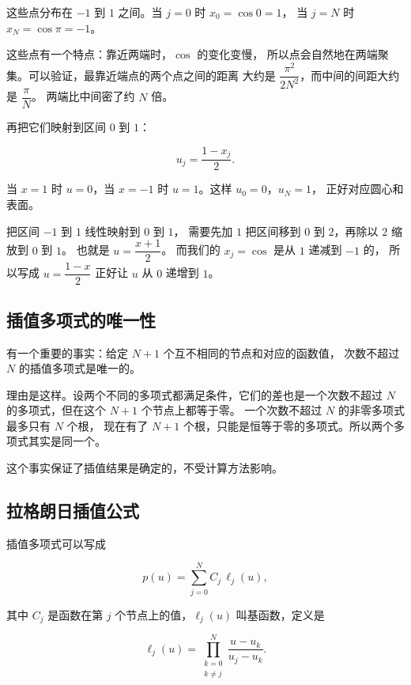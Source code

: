 这些点分布在 $-1$ 到 $1$ 之间。当 $j=0$ 时 $x_0=\cos0=1$，
当 $j=N$ 时 $x_N=\cos\pi=-1$。

这些点有一个特点：靠近两端时，$\cos$ 的变化变慢，
所以点会自然地在两端聚集。可以验证，最靠近端点的两个点之间的距离
大约是 $\dfrac{\pi^2}{2N^2}$，而中间的间距大约是 $\dfrac{\pi}{N}$。
两端比中间密了约 $N$ 倍。

再把它们映射到区间 $0$ 到 $1$：

\begin{equation}
u_j = \frac{1-x_j}{2}.
\label{eq:map01}
\end{equation}

当 $x=1$ 时 $u=0$，当 $x=-1$ 时 $u=1$。这样 $u_0=0$，$u_N=1$，
正好对应圆心和表面。

把区间 $-1$ 到 $1$ 线性映射到 $0$ 到 $1$，
需要先加 $1$ 把区间移到 $0$ 到 $2$，再除以 $2$ 缩放到 $0$ 到 $1$。
也就是 $u=\dfrac{x+1}{2}$。
而我们的 $x_j=\cos$ 是从 $1$ 递减到 $-1$ 的，
所以写成 $u=\dfrac{1-x}{2}$ 正好让 $u$ 从 $0$ 递增到 $1$。

\subsection{插值多项式的唯一性}

有一个重要的事实：给定 $N+1$ 个互不相同的节点和对应的函数值，
次数不超过 $N$ 的插值多项式是唯一的。

理由是这样。设两个不同的多项式都满足条件，它们的差也是一个次数不超过 $N$
的多项式，但在这个 $N+1$ 个节点上都等于零。
一个次数不超过 $N$ 的非零多项式最多只有 $N$ 个根，
现在有了 $N+1$ 个根，只能是恒等于零的多项式。所以两个多项式其实是同一个。

这个事实保证了插值结果是确定的，不受计算方法影响。

\subsection{拉格朗日插值公式}

插值多项式可以写成

\begin{equation}
p(u) = \sum_{j=0}^{N} C_j\,\ell_j(u),
\label{eq:lagrange}
\end{equation}

其中 $C_j$ 是函数在第 $j$ 个节点上的值，$\ell_j(u)$ 叫基函数，定义是

\begin{equation}
\ell_j(u) = \prod_{\substack{k=0\\k\ne j}}^{N}\frac{u-u_k}{u_j-u_k}.
\label{eq:basis}
\end{equation}

